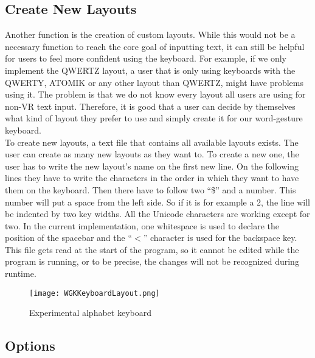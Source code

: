 \subsection{Create New Layouts}
Another function is the creation of custom layouts. While this would not be a necessary function to reach the core goal of inputting text, it can still be helpful for users to feel more confident using the keyboard. For example, if we only implement the QWERTZ layout, a user that is only using keyboards with the QWERTY, ATOMIK or any other layout than QWERTZ, might have problems using it. The problem is that we do not know every layout all users are using for non-VR text input. Therefore, it is good that a user can decide by themselves what kind of layout they prefer to use and simply create it for our word-gesture keyboard.\\
To create new layouts, a text file that contains all available layouts exists. The user can create as many new layouts as they want to. To create a new one, the user has to write the new layout's name on the first new line. On the following lines they have to write the characters in the order in which they want to have them on the keyboard. Then there have to follow two ``\$'' and a number. This number will put a space from the left side. So if it is for example a 2, the line will be indented by two key widths. All the Unicode characters are working except for two. In the current implementation, one whitespace is used to declare the position of the spacebar and the ``$<$'' character is used for the backspace key. This file gets read at the start of the program, so it cannot be edited while the program is running, or to be precise, the changes will not be recognized during runtime. 
\begin{figure}[H]
    \centering
    \texttt{[image: WGKKeyboardLayout.png]}
    \caption{Experimental alphabet keyboard}
    \label{fig:WGKLayout}
\end{figure}

\subsection{Options}

